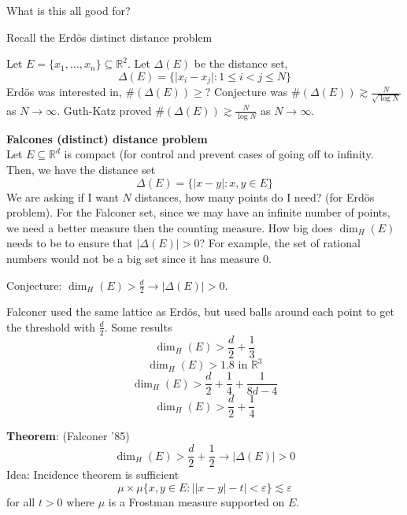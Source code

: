 \documentclass[12pt]{article}
\begin{document}
What is this all good for?

\noindent Recall the Erd\"os distinct distance problem

\noindent Let $E = \{x_1, \dots, x_n\} \subseteq \mathbb{R}^2$. Let $\Delta(E)$ be the distance set, 
$$\Delta(E)=\{\vert x_i - x_j \vert : 1 \leq i < j \leq N\}$$
Erd\"os was interested in, 
$\#(\Delta(E)) \geq ?$
Conjecture was $\#(\Delta(E)) \gtrsim \frac{N}{\sqrt{\log N}}$ as $N\rightarrow \infty$. 
Guth-Katz proved $\#(\Delta(E)) \gtrsim \frac{N}{\log N}$ as $N\rightarrow \infty$.

\textbf{Falcones (distinct) distance problem} \\

Let $E \subseteq \mathbb{R}^d$ is compact (for control and prevent cases of going off to infinity. Then, we have the distance set
$$\Delta(E) = \{ \vert x- y \vert: x,y \in E\}$$
We are asking if I want $N$ distances, how many points do I need? (for Erd\"os problem). For the Falconer set, since we may have an infinite number of points, we need a better measure then the counting measure. How big does $\dim_H(E)$ needs to be to ensure that $\vert \Delta(E)\vert>0$? For example, the set of rational numbers would not be a big set since it has measure 0. 

\noindent Conjecture: $\dim_H(E) > \frac{d}{2} \rightarrow \vert \Delta(E)\vert > 0$. 

Falconer used the same lattice as Erd\"os, but used balls around each point to get the threshold with $\frac{d}{2}$. Some results
$$\dim_H(E) > \frac{d}{2} +\frac{1}{3}$$
$$\dim_H(E) > 1.8 \text{ in } \mathbb{R}^3$$
$$\dim_H(E)>\frac{d}{2} + \frac{1}{4} + \frac{1}{8d-4}$$
$$\dim_H(E) > \frac{d}{2} + \frac{1}{4}$$

\noindent \textbf{Theorem}: (Falconer '85)
$$\dim_H(E) > \frac{d}{2} + \frac{1}{2} \rightarrow \vert \Delta(E) \vert >0$$
\noindent Idea: Incidence theorem is sufficient
$$\mu \times \mu \{x,y \in E : \vert\vert x-y \vert -t \vert < \varepsilon \} \lesssim \varepsilon$$
for all $t > 0$ where $\mu$ is a Frostman measure supported on $E$. 
\end{document}
